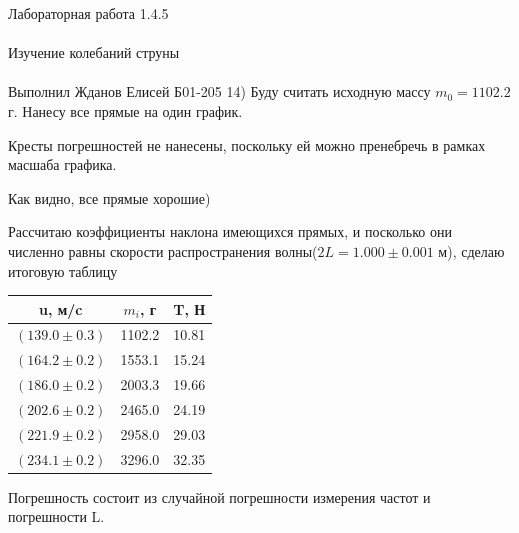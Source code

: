 \documentclass{astroedu-lab}
\begin{document}
\begin{problem}{\huge Лабораторная работа 1.4.5\\\\Изучение колебаний струны\\\\Выполнил Жданов Елисей Б01-205}
14) Буду считать исходную массу $m_0 = 1102.2$ г. Нанесу все прямые на один график.

\begin{center}
\end{center}

Кресты погрешностей не нанесены, поскольку ей можно пренебречь в рамках масшаба графика.

Как видно, все прямые хорошие)

Рассчитаю коэффициенты наклона имеющихся прямых, и посколько они численно равны скорости распространения волны($2 L = 1.000 \pm 0.001$ м), сделаю итоговую таблицу

\begin{center}
\begin{tabular}{|c|c|c|}
\hline u, м/c & $m_i$, г & T, Н \\ \hline
$(139.0 \pm 0.3)$ & 1102.2 & 10.81 \\
$(164.2 \pm 0.2)$ & 1553.1 & 15.24 \\
$(186.0 \pm 0.2)$ & 2003.3 & 19.66 \\
$(202.6 \pm 0.2)$ & 2465.0 & 24.19 \\
$(221.9 \pm 0.2)$ & 2958.0 & 29.03 \\
$(234.1 \pm 0.2)$ & 3296.0 & 32.35 \\
\hline
\end{tabular}
\end{center}

Погрешность состоит из случайной погрешности измерения частот и погрешности L.


\end{problem}
\end{document}
